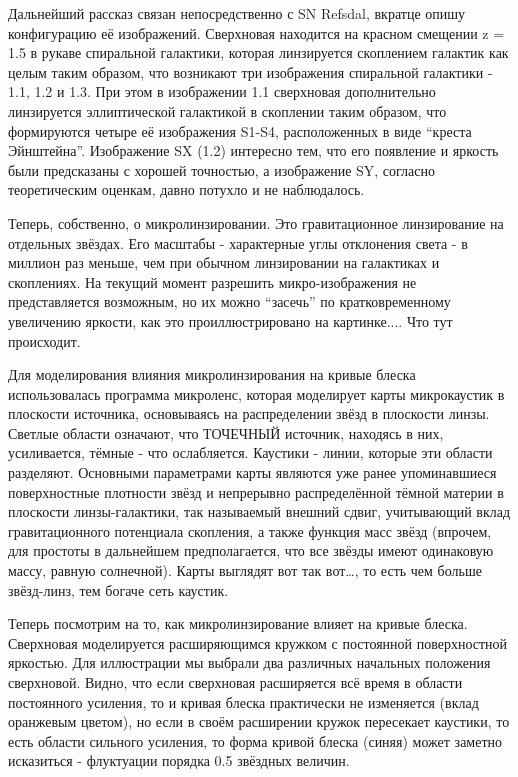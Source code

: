 Дальнейший рассказ связан непосредственно с SN Refsdal, вкратце опишу конфигурацию её изображений. Сверхновая находится на красном смещении z = 1.5 в рукаве спиральной галактики, которая линзируется скоплением галактик как целым таким образом, что возникают три изображения спиральной галактики - 1.1, 1.2 и 1.3. При этом в изображении 1.1 сверхновая дополнительно линзируется эллиптической галактикой в скоплении таким образом, что формируются четыре её изображения S1-S4, расположенных в виде “креста Эйнштейна”. Изображение SX (1.2) интересно тем, что его появление и яркость были предсказаны с хорошей точностью, а изображение SY, согласно теоретическим оценкам,  давно потухло и не наблюдалось.

Теперь, собственно, о микролинзировании. Это гравитационное линзирование на отдельных звёздах. Его масштабы - характерные углы отклонения света - в миллион раз меньше, чем при обычном линзировании на галактиках и скоплениях. На текущий момент разрешить микро-изображения не представляется возможным, но их можно “засечь” по кратковременному увеличению яркости, как это проиллюстрировано на картинке.... Что тут происходит.

Для моделирования влияния микролинзирования на кривые блеска использовалась программа микроленс, которая моделирует карты микрокаустик в плоскости источника, основываясь на распределении звёзд в плоскости линзы. Светлые области означают, что ТОЧЕЧНЫЙ источник, находясь в них, усиливается, тёмные - что ослабляется. Каустики - линии, которые эти области разделяют. Основными параметрами карты являются уже ранее упоминавшиеся поверхностные плотности звёзд и непрерывно распределённой тёмной материи в плоскости линзы-галактики, так называемый внешний сдвиг, учитывающий вклад гравитационного потенциала скопления, а также функция масс звёзд (впрочем, для простоты в дальнейшем предполагается, что все звёзды имеют одинаковую массу, равную солнечной). Карты выглядят вот так вот…, то есть чем больше звёзд-линз, тем богаче сеть каустик. 

Теперь посмотрим на то, как микролинзирование влияет на кривые блеска. Сверхновая моделируется расширяющимся кружком с постоянной поверхностной яркостью. Для иллюстрации мы выбрали два различных начальных положения сверхновой. Видно, что если сверхновая расширяется всё время в области постоянного усиления, то и кривая блеска практически не изменяется (вклад оранжевым цветом), но если в своём расширении кружок пересекает каустики, то есть области сильного усиления, то форма кривой блеска (синяя) может заметно исказиться - флуктуации порядка 0.5 звёздных величин.

